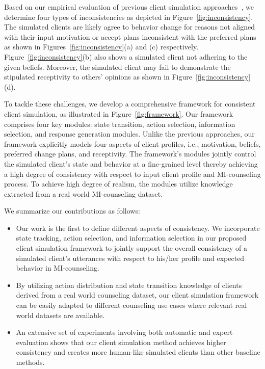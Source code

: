 Based on our empirical evaluation of previous client simulation approaches~\citep{yosef2024assessing,chiu2024computational,wang2024towards}, we determine four types of inconsistencies as depicted in Figure~\ref{fig:inconsistency}. The simulated clients are likely agree to behavior change for reasons not aligned with their input motivation or accept plans inconsistent with the preferred plans as shown in Figures~\ref{fig:inconsistency}(a) and  (c) respectively. Figure~\ref{fig:inconsistency}(b) also shows a simulated client not adhering to the given beliefs. Moreover, the simulated client may fail to demonstrate the stipulated receptivity to others' opinions as shown in Figure~\ref{fig:inconsistency}(d).

To tackle these challenges, we develop a comprehensive framework for consistent client simulation, as illustrated in Figure~\ref{fig:framework}. Our framework comprises four key modules: state transition, action selection, information selection, and response generation modules. Unlike the previous approaches, our framework explicitly models four aspects of client profiles, i.e., motivation, beliefs, preferred change plans, and receptivity. The framework's modules jointly control the simulated client's state and behavior at a fine-grained level thereby achieving a high degree of consistency with respect to input client profile and MI-counseling process. To achieve high degree of realism, the modules utilize knowledge extracted from a real world MI-counseling dataset.

We summarize our contributions as follows:

\begin{itemize}
    \item Our work is the first to define different aspects of consistency. We incorporate state tracking, action selection, and information selection in our proposed client simulation framework to  jointly support the overall consistency of a simulated client's utterances with respect to his/her profile and expected behavior in MI-counseling.
    \item By utilizing action distribution and state transition knowledge of clients derived from a real world counseling dataset, our client simulation framework can be easily adapted to different counseling use cases where relevant real world datasets are available. %
    \item An extensive set of experiments involving both automatic and expert evaluation shows that our client simulation method achieves higher consistency and creates more human-like simulated clients than other baseline methods.
\end{itemize}
